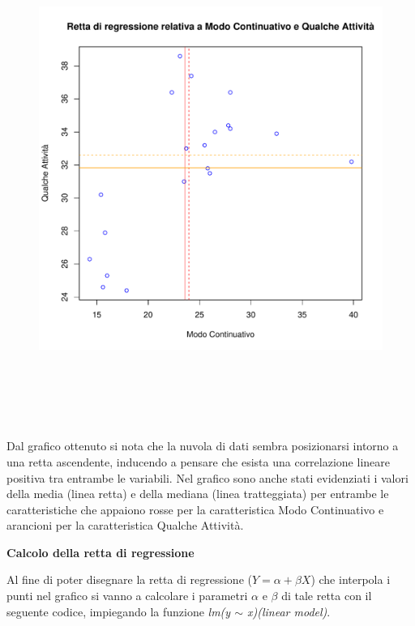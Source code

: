 \begin{figure}[!htbp]
    \centering
    \includegraphics[height=16cm]{ProgettoSAD/capitoli/images/s_desc_biv/scatterplot_variabili.pdf}
\end{figure}

Dal grafico ottenuto si nota che la nuvola di dati sembra posizionarsi intorno a una retta ascendente, inducendo a pensare che esista una correlazione lineare positiva tra entrambe le variabili. Nel grafico sono anche stati evidenziati i valori della media (linea retta) e della mediana (linea tratteggiata) per entrambe le caratteristiche che appaiono rosse per la caratteristica Modo Continuativo e arancioni per la caratteristica Qualche Attività.

\noindent \textbf{Calcolo della retta di regressione}

Al fine di poter disegnare la retta di regressione ($Y = \alpha + \beta X$) che interpola i punti nel grafico si vanno a calcolare i parametri $\alpha$ e $\beta$ di tale retta con il seguente codice, impiegando la funzione \textit{lm(y $\sim$ x)(linear model)}.

